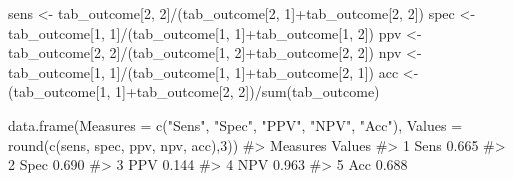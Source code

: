 \documentclass[
  letterpaper,
]{latex/krantz}
\makeatletter
\newenvironment{Shaded}{\begin{snugshade}}{\end{snugshade}}
\newcommand{\AttributeTok}[1]{\textcolor[rgb]{0.40,0.45,0.13}{#1}}
\newcommand{\CommentTok}[1]{\textcolor[rgb]{0.37,0.37,0.37}{#1}}
\newcommand{\DecValTok}[1]{\textcolor[rgb]{0.68,0.00,0.00}{#1}}
\newcommand{\FunctionTok}[1]{\textcolor[rgb]{0.28,0.35,0.67}{#1}}
\newcommand{\NormalTok}[1]{\textcolor[rgb]{0.00,0.23,0.31}{#1}}
\newcommand{\OtherTok}[1]{\textcolor[rgb]{0.00,0.23,0.31}{#1}}
\newcommand{\SpecialCharTok}[1]{\textcolor[rgb]{0.37,0.37,0.37}{#1}}
\newcommand{\StringTok}[1]{\textcolor[rgb]{0.13,0.47,0.30}{#1}}
\newenvironment{kframe}{%
\medskip{}
\setlength{\fboxsep}{.8em}
 \def\at@end@of@kframe{}%
 \ifinner\ifhmode%
  \def\at@end@of@kframe{\end{minipage}}%
  \begin{minipage}{\columnwidth}%
 \fi\fi%
 \def\FrameCommand##1{\hskip\@totalleftmargin \hskip-\fboxsep
 \colorbox{shadecolor}{##1}\hskip-\fboxsep
     \hskip-\linewidth \hskip-\@totalleftmargin \hskip\columnwidth}%
 \MakeFramed {\advance\hsize-\width
   \@totalleftmargin\z@ \linewidth\hsize
   \@setminipage}}%
 {\par\unskip\endMakeFramed%
 \at@end@of@kframe}
\renewenvironment{Shaded}{\begin{kframe}}{\end{kframe}}
\makeatother
\begin{document}
\begin{Shaded}
\begin{Highlighting}[]
\NormalTok{sens }\OtherTok{\textless{}{-}}\NormalTok{ tab\_outcome[}\DecValTok{2}\NormalTok{, }\DecValTok{2}\NormalTok{]}\SpecialCharTok{/}\NormalTok{(tab\_outcome[}\DecValTok{2}\NormalTok{, }\DecValTok{1}\NormalTok{]}\SpecialCharTok{+}\NormalTok{tab\_outcome[}\DecValTok{2}\NormalTok{, }\DecValTok{2}\NormalTok{])}
\NormalTok{spec }\OtherTok{\textless{}{-}}\NormalTok{ tab\_outcome[}\DecValTok{1}\NormalTok{, }\DecValTok{1}\NormalTok{]}\SpecialCharTok{/}\NormalTok{(tab\_outcome[}\DecValTok{1}\NormalTok{, }\DecValTok{1}\NormalTok{]}\SpecialCharTok{+}\NormalTok{tab\_outcome[}\DecValTok{1}\NormalTok{, }\DecValTok{2}\NormalTok{])}
\NormalTok{ppv }\OtherTok{\textless{}{-}}\NormalTok{ tab\_outcome[}\DecValTok{2}\NormalTok{, }\DecValTok{2}\NormalTok{]}\SpecialCharTok{/}\NormalTok{(tab\_outcome[}\DecValTok{1}\NormalTok{, }\DecValTok{2}\NormalTok{]}\SpecialCharTok{+}\NormalTok{tab\_outcome[}\DecValTok{2}\NormalTok{, }\DecValTok{2}\NormalTok{])}
\NormalTok{npv }\OtherTok{\textless{}{-}}\NormalTok{ tab\_outcome[}\DecValTok{1}\NormalTok{, }\DecValTok{1}\NormalTok{]}\SpecialCharTok{/}\NormalTok{(tab\_outcome[}\DecValTok{1}\NormalTok{, }\DecValTok{1}\NormalTok{]}\SpecialCharTok{+}\NormalTok{tab\_outcome[}\DecValTok{2}\NormalTok{, }\DecValTok{1}\NormalTok{])}
\NormalTok{acc }\OtherTok{\textless{}{-}}\NormalTok{ (tab\_outcome[}\DecValTok{1}\NormalTok{, }\DecValTok{1}\NormalTok{]}\SpecialCharTok{+}\NormalTok{tab\_outcome[}\DecValTok{2}\NormalTok{, }\DecValTok{2}\NormalTok{])}\SpecialCharTok{/}\FunctionTok{sum}\NormalTok{(tab\_outcome)}
\end{Highlighting}
\end{Shaded}

\begin{Shaded}
\begin{Highlighting}[]
\FunctionTok{data.frame}\NormalTok{(}\AttributeTok{Measures =} \FunctionTok{c}\NormalTok{(}\StringTok{"Sens"}\NormalTok{, }\StringTok{"Spec"}\NormalTok{, }\StringTok{"PPV"}\NormalTok{, }\StringTok{"NPV"}\NormalTok{, }\StringTok{"Acc"}\NormalTok{),}
          \AttributeTok{Values =} \FunctionTok{round}\NormalTok{(}\FunctionTok{c}\NormalTok{(sens, spec, ppv, npv, acc),}\DecValTok{3}\NormalTok{))}
\CommentTok{\#\textgreater{}   Measures Values}
\CommentTok{\#\textgreater{} 1     Sens  0.665}
\CommentTok{\#\textgreater{} 2     Spec  0.690}
\CommentTok{\#\textgreater{} 3      PPV  0.144}
\CommentTok{\#\textgreater{} 4      NPV  0.963}
\CommentTok{\#\textgreater{} 5      Acc  0.688}
\end{Highlighting}
\end{Shaded}
\end{document}

